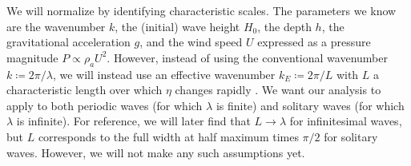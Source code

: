 \documentclass{jfm}
\begin{document}
We will normalize by identifying characteristic scales.
The parameters we know \apriori are the wavenumber $k$, the (initial)
wave height $H_0$, the depth $h$, the gravitational acceleration $g$,
and the wind speed $U$ expressed as a pressure magnitude $P \propto
\rho_a U^2$.
However, instead of using the conventional wavenumber $k \coloneqq 2 \pi
/ \lambda$, we will instead use an effective wavenumber $k_E \coloneqq 2
\pi/ L$ with $L$ a characteristic length over which $\eta$ changes
rapidly \citep[\cf{} pg.\ 703 of][for a similar
discussion]{dingemans1997water}.
We want our analysis to apply to both periodic waves (for which
$\lambda$ is finite) and solitary waves (for which $\lambda$ is
infinite).
For reference, we will later find that $L \to \lambda$ for infinitesimal
waves, but $L$ corresponds to the full width at half maximum times $\pi/2$ for solitary
waves.
However, we will not make any such assumptions yet.
\end{document}
